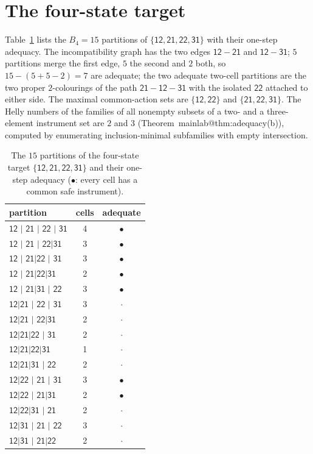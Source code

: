 \documentclass[11pt,a4paper]{article}
\makeatletter
\theoremstyle{plain}
\theoremstyle{definition}
\theoremstyle{remark}
\newcommand{\st}[1]{\mathsf{#1}}
\newcommand{\mref}[1]{\csname mainlab@#1\endcsname}
\makeatother
\begin{document}
\section{The four-state target}\label{si:target}

Table~\ref{tab:target} lists the $B_4=15$ partitions of $\{\st{12},\st{21},\st{22},\st{31}\}$ with their one-step adequacy. The incompatibility graph has the two edges $\st{12}-\st{21}$ and $\st{12}-\st{31}$; $5$ partitions merge the first edge, $5$ the second and $2$ both, so $15-(5+5-2)=7$ are adequate; the two adequate two-cell partitions are the two proper $2$-colourings of the path $\st{21}-\st{12}-\st{31}$ with the isolated $\st{22}$ attached to either side. The maximal common-action sets are $\{\st{12},\st{22}\}$ and $\{\st{21},\st{22},\st{31}\}$. The Helly numbers of the families of all nonempty subsets of a two- and a three-element instrument set are $2$ and $3$ (Theorem~\mref{thm:adequacy}(b)), computed by enumerating inclusion-minimal subfamilies with empty intersection.

\begin{table}[H]
\centering\small
\caption{The $15$ partitions of the four-state target $\{\st{12},\st{21},\st{22},\st{31}\}$ and their one-step adequacy ($\bullet$: every cell has a common safe instrument).}
\label{tab:target}
\begin{tabular}{lcc}
\toprule
partition & cells & adequate \\
\midrule
$\st{12}$ $\mid$ $\st{21}$ $\mid$ $\st{22}$ $\mid$ $\st{31}$ & 4 & $\bullet$ \\
$\st{12}$ $\mid$ $\st{21}$ $\mid$ $\st{22|31}$ & 3 & $\bullet$ \\
$\st{12}$ $\mid$ $\st{21|22}$ $\mid$ $\st{31}$ & 3 & $\bullet$ \\
$\st{12}$ $\mid$ $\st{21|22|31}$ & 2 & $\bullet$ \\
$\st{12}$ $\mid$ $\st{21|31}$ $\mid$ $\st{22}$ & 3 & $\bullet$ \\
$\st{12|21}$ $\mid$ $\st{22}$ $\mid$ $\st{31}$ & 3 & $\cdot$ \\
$\st{12|21}$ $\mid$ $\st{22|31}$ & 2 & $\cdot$ \\
$\st{12|21|22}$ $\mid$ $\st{31}$ & 2 & $\cdot$ \\
$\st{12|21|22|31}$ & 1 & $\cdot$ \\
$\st{12|21|31}$ $\mid$ $\st{22}$ & 2 & $\cdot$ \\
$\st{12|22}$ $\mid$ $\st{21}$ $\mid$ $\st{31}$ & 3 & $\bullet$ \\
$\st{12|22}$ $\mid$ $\st{21|31}$ & 2 & $\bullet$ \\
$\st{12|22|31}$ $\mid$ $\st{21}$ & 2 & $\cdot$ \\
$\st{12|31}$ $\mid$ $\st{21}$ $\mid$ $\st{22}$ & 3 & $\cdot$ \\
$\st{12|31}$ $\mid$ $\st{21|22}$ & 2 & $\cdot$ \\
\bottomrule
\end{tabular}
\end{table}
\end{document}
